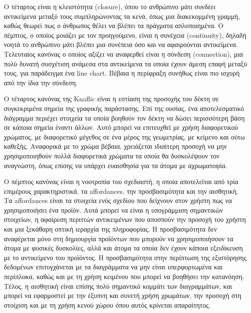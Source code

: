 \documentclass{article}
\begin{document}
Ο τέταρτος είναι η κλειστότητα (closure), όπου το ανθρώπινο μάτι συνδέει αντικείμενα μεταξύ τους συμπληρώνοντας τα κενά, όπως μια διακεκομμένη γραμμή, καθώς θεωρεί πως ο άνθρωπος θέλει να βλέπει τα πράγματα απλοποιημένα. Ο πέμπτος, ο οποίος μοιάζει με τον προηγούμενο, είναι η συνέχεια (continuity), δηλαδή νοητά το ανθρώπινο μάτι βλέπει μια συνέπεια όσο και να αφαιρούνται αντικείμενα. Τελευταίος κανόνας ο οποίος αξίζει να αναφερθεί είναι η σύνδεση (connection), μια πολύ δυνατή συσχέτιση ανάμεσα στα αντικείμενα τα οποία έχουν άμεση επαφή μεταξύ τους, για παράδειγμα ένα line chart. Βέβαια η περίφραξη συνήθως είναι πιο ισχυρή από την ίδια την σύνδεση. \cite{knaflic2015storytelling, wagemans2012century2}

Ο τέταρτος κανόνας της Knaflic είναι η εστίαση της προσοχής του δέκτη σε συγκεκριμένα σημεία της γραφικής παράστασης. Επί της ουσίας, ένα αποτελεσματικό διάγραμμα περιέχει στοιχεία τα οποία βοηθούν τον δέκτη να δώσει περισσότερη βάση σε κάποια σημεία έναντι άλλων. Αυτό μπορεί να επιτευχθεί με χρήση διαφορετικού χρώματος, με διαφορετικό μέγεθος σε ένα μέρος της γεωμετρίας, με κείμενο και ούτω καθεξής. Αναφορικά με το χρώμα βέβαια, χρειάζεται ιδιαίτερη προσοχή να μην χρησιμοποιηθούν πολλά διαφορετικά χρώματα τα οποία θα δυσκολέψουν τον αναγνώστη, όπως επίσης να υπάρχει ευαισθησία για τα άτομα με αχρωματοψία. \cite{knaflic2015storytelling}

Ο πέμπτος κανόνας είναι η νοοτροπία του σχεδιαστή, η οποία αποτελείται από τρία επιμέρους χαρακτηριστικά, τα affordances, την προσβασιμότητα και την αισθητική. Τα affordances \cite{norman2004affordances} είναι τα στοιχεία ενός σχεδίου που δείχνουν στον χρήστη πως να χρησιμοποιήσει ένα προϊόν. Αυτά μπορεί να είναι η υπογράμμιση σημαντικών στοιχείων, η αφαίρεση περιττών αντικειμένων που αποσπούν την προσοχή του χρήστη και μια ξεκάθαρη οπτική ιεραρχία της πληροφορίας. Η προσβασιμότητα δεν αναφέρεται μόνο στη δημιουργία προϊόντων που μπορούν να χρησιμοποιήσουν τα άτομα με φυσικές δυσκολίες, αλλά και άτομα τα οποία δεν έχουν κάποια εξειδίκευση με το αντικείμενο του προϊόντος. Η προσβασιμότητα στην περίπτωση της εξιστόρησης δεδομένων επιτυγχάνεται με τα διαγράμματα να μην είναι υπερφορτωμένα και περίπλοκα, καθώς και με τη χρήση κειμένου που μπορεί να βοηθήσει την κατανόηση. Τέλος, η αισθητική είναι επίσης πολύ σημαντικό κομμάτι των διαγραμμάτων, και μπορεί να εφαρμοστεί με την έξυπνη και συνετή χρήση χρωμάτων, την προσοχή στη στοίχιση και με τη χρήση κενού χώρου όπου αυτός κρίνεται απαραίτητος. \cite{knaflic2015storytelling}
\end{document}
